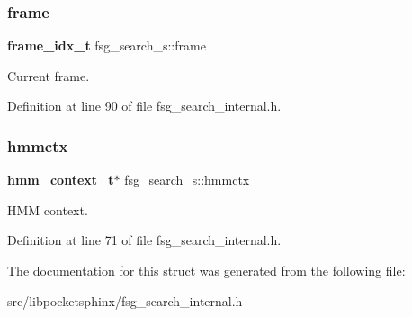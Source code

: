 \subsubsection{frame}
{\footnotesize\ttfamily \textbf{ frame\+\_\+idx\+\_\+t} fsg\+\_\+search\+\_\+s\+::frame}



Current frame. 



Definition at line 90 of file fsg\+\_\+search\+\_\+internal.\+h.

\mbox{\label{structfsg__search__s_a7407bdf5f311caf9d46817b3387b798c}} 
\subsubsection{hmmctx}
{\footnotesize\ttfamily \textbf{ hmm\+\_\+context\+\_\+t}$\ast$ fsg\+\_\+search\+\_\+s\+::hmmctx}



H\+MM context. 



Definition at line 71 of file fsg\+\_\+search\+\_\+internal.\+h.



The documentation for this struct was generated from the following file\+:\begin{DoxyCompactItemize}
\item 
src/libpocketsphinx/fsg\+\_\+search\+\_\+internal.\+h\end{DoxyCompactItemize}
